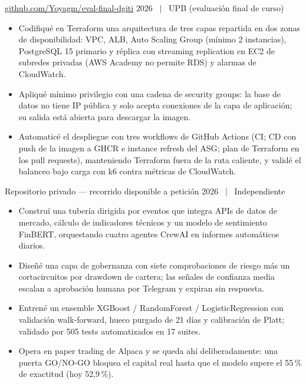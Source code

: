 %
  {\href{https://github.com/Yoyagm/eval-final-dgiti}{github.com/Yoyagm/eval-final-dgiti}}%
  {2026 \ $\vert$ \ UPB (evaluación final de curso)}
\begin{itemize}
  \item Codifiqué en Terraform una arquitectura de tres capas repartida en dos zonas de
        disponibilidad: VPC, ALB, Auto Scaling Group (mínimo 2 instancias), PostgreSQL 15 primario y
        réplica con streaming replication en EC2 de subredes privadas (AWS Academy no permite RDS) y
        alarmas de CloudWatch.
  \item Apliqué mínimo privilegio con una cadena de security groups: la base de datos no tiene IP
        pública y solo acepta conexiones de la capa de aplicación; su salida está abierta para
        descargar la imagen.
  \item Automaticé el despliegue con tres workflows de GitHub Actions (CI; CD con push de la imagen a
        GHCR e instance refresh del ASG; plan de Terraform en los pull requests), manteniendo
        Terraform fuera de la ruta caliente, y validé el balanceo bajo carga con k6 contra métricas
        de CloudWatch.
\end{itemize}

%
  {Repositorio privado --- recorrido disponible a petición}%
  {2026 \ $\vert$ \ Independiente}
\begin{itemize}
  \item Construí una tubería dirigida por eventos que integra APIs de datos de mercado, cálculo de
        indicadores técnicos y un modelo de sentimiento FinBERT, orquestando cuatro agentes CrewAI
        en informes automáticos diarios.
  \item Diseñé una capa de gobernanza con siete comprobaciones de riesgo más un cortacircuitos por
        drawdown de cartera; las señales de confianza media escalan a aprobación humana por
        Telegram y expiran sin respuesta.
  \item Entrené un ensemble XGBoost / RandomForest / LogisticRegression con validación
        walk-forward, hueco purgado de 21 días y calibración de Platt; validado por 505 tests
        automatizados en 17 suites.
  \item Opera en paper trading de Alpaca y se queda ahí deliberadamente: una puerta GO/NO-GO
        bloquea el capital real hasta que el modelo supere el 55\,\% de exactitud (hoy 52,9\,\%).
\end{itemize}

